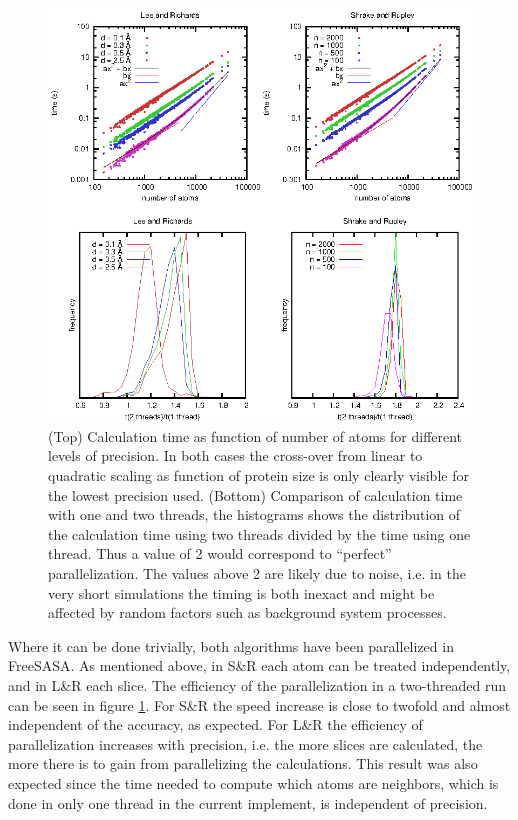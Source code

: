 \documentclass[a4paper,11pt]{article}
\begin{document}
\begin{small}
\begin{figure}
  \begin{center}
  \includegraphics{fig/time}
  \caption{(Top) Calculation time as function of number of atoms for
    different levels of precision. In both cases the cross-over from
    linear to quadratic scaling as function of protein size is only
    clearly visible for the lowest precision used.  (Bottom)
    Comparison of calculation time with one and two threads, the
    histograms shows the distribution of the calculation time using
    two threads divided by the time using one thread. Thus a value of
    2 would correspond to ``perfect'' parallelization. The values
    above 2 are likely due to noise, i.e. in the very short
    simulations the timing is both inexact and might be affected by
    random factors such as background system processes.
    \label{fig:time}}
  \end{center}
\end{figure}

Where it can be done trivially, both algorithms have been
parallelized in FreeSASA. As mentioned above, in S\&R each atom can be treated
independently, and in L\&R each slice. The efficiency of the
parallelization in a two-threaded run can be seen in figure
\ref{fig:time}. For S\&R the speed increase is close to twofold and
almost independent of the accuracy, as expected. For L\&R the
efficiency of parallelization increases with precision, i.e. the more
slices are calculated, the more there is to gain from parallelizing
the calculations. This result was also expected since the time needed
to compute which atoms are neighbors, which is done in only one thread
in the current implement, is independent of precision.


\end{small}
\end{document}
